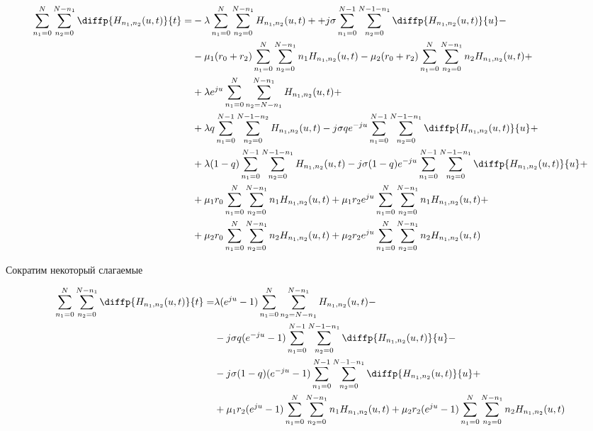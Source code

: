 \begin{equation*}
\begin{aligned}
	\sum_{n_1=0}^N\sum_{n_2=0}^{N-n_1} \diffp{H_{n_1,n_2}(u,t)}{t}=
	&-\lambda \sum_{n_1=0}^N\sum_{n_2=0}^{N-n_1} H_{n_1, n_2}(u,t)+
	 +j\sigma \sum_{n_1=0}^{N-1}\sum_{n_2=0}^{N-1-n_1} 
	 \diffp{H_{n_1, n_2}(u,t)}{u}-\\
	&-\mu_1 (r_0+r_2) \sum_{n_1=0}^N\sum_{n_2=0}^{N-n_1} n_1 H_{n_1, n_2}(u,t)
	 -\mu_2 (r_0+r_2)\sum_{n_1=0}^N\sum_{n_2=0}^{N-n_1} n_2 H_{n_1, n_2}(u,t)+\\
	&+\lambda e^{ju}\sum_{n_1=0}^N\sum_{n_2=N-n_1}^{N-n_1} 
	  H_{n_1, n_2}(u,t)+\\
	&+\lambda q \sum_{n_1=0}^{N-1}\sum_{n_2=0}^{N-1-n_2} 
	  H_{n_1, n_2}(u,t)
	 -j \sigma q e^{-ju} \sum_{n_1=0}^{N-1}\sum_{n_2=0}^{N-1-n_1} 
	   \diffp{H_{n_1, n_2}(u,t)}{u}+\\
	&+\lambda (1-q) \sum_{n_1=0}^{N-1}\sum_{n_2=0}^{N-1-n_1} 
	  H_{n_1, n_2}(u,t) 
	 -j \sigma (1-q) e^{-ju}\sum_{n_1=0}^{N-1}\sum_{n_2=0}^{N-1-n_1} 
	  \diffp{H_{n_1, n_2}(u,t)}{u}+\\
	&+\mu_1 r_0 \sum_{n_1=0}^N\sum_{n_2=0}^{N-n_1} 
	  n_1 H_{n_1, n_2}(u,t)
	+\mu_1 r_2 e^{ju}\sum_{n_1=0}^{N}\sum_{n_2=0}^{N-n_1} 
	  n_1 H_{n_1, n_2}(u,t)+\\
	&+\mu_2 r_0 \sum_{n_1=0}^N\sum_{n_2=0}^{N-n_1} 
	  n_2 H_{n_1, n_2}(u,t)
	 +\mu_2 r_2 e^{ju}\sum_{n_1=0}^{N}\sum_{n_2=0}^{N-n_1} 
	  n_2 H_{n_1, n_2}(u,t)\\
\end{aligned}
\end{equation*}

Сократим некоторый слагаемые 

\begin{equation*}
\begin{aligned}
	\sum_{n_1=0}^N\sum_{n_2=0}^{N-n_1} \diffp{H_{n_1,n_2}(u,t)}{t}=
	&\lambda (e^{ju} - 1)\sum_{n_1=0}^N\sum_{n_2=N-n_1}^{N-n_1} 
	  H_{n_1, n_2}(u,t)-\\
	&-j \sigma q (e^{-ju}-1) \sum_{n_1=0}^{N-1}\sum_{n_2=0}^{N-1-n_1} 
	   \diffp{H_{n_1, n_2}(u,t)}{u}-\\
	&-j \sigma (1-q) (e^{-ju}-1)\sum_{n_1=0}^{N-1}\sum_{n_2=0}^{N-1-n_1} 
	  \diffp{H_{n_1, n_2}(u,t)}{u}+\\
	&+\mu_1 r_2 (e^{ju} -1)\sum_{n_1=0}^{N}\sum_{n_2=0}^{N-n_1} 
	n_1 H_{n_1, n_2}(u,t)
	+\mu_2 r_2 (e^{ju} -1)\sum_{n_1=0}^{N}\sum_{n_2=0}^{N-n_1} 
	n_2 H_{n_1, n_2}(u,t)\\
\end{aligned}
\end{equation*}

